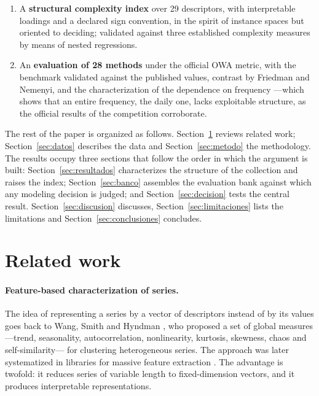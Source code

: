 \begin{enumerate}
      combining becomes a hindrance and the contribution of stratification loses
      significance. The regime is a property of the set of models and is determined
      frequency by frequency, not globally. From this follows an operating rule ---look at
      the quality spread of the pool before deciding--- which this work does not validate
      outside M4 for the regime, although the replication on M3 confirms it on the
      selection side.
\item A \textbf{structural complexity index} over 29 descriptors, with interpretable
      loadings and a declared sign convention, in the spirit of instance spaces
      \cite{kang2017} but oriented to deciding; validated against three established
      complexity measures by means of nested regressions.
\item An \textbf{evaluation of 28 methods} under the official OWA metric, with the
      benchmark validated against the published values, contrast by Friedman and Nemenyi,
      and the characterization of the dependence on frequency ---which shows that an
      entire frequency, the daily one, lacks exploitable structure, as the official
      results of the competition corroborate.
\end{enumerate}

The rest of the paper is organized as follows. Section~\ref{sec:trabajo} reviews related
work; Section~\ref{sec:datos} describes the data and Section~\ref{sec:metodo} the
methodology. The results occupy three sections that follow the order in which the argument
is built: Section~\ref{sec:resultados} characterizes the structure of the collection and
raises the index; Section~\ref{sec:banco} assembles the evaluation bank against which any
modeling decision is judged; and Section~\ref{sec:decision} tests the central result.
Section~\ref{sec:discusion} discusses, Section~\ref{sec:limitaciones} lists the
limitations and Section~\ref{sec:conclusiones} concludes.


\section{Related work}\label{sec:trabajo}

\paragraph{Feature-based characterization of series.} The idea of representing a series by
a vector of descriptors instead of by its values goes back to Wang, Smith and Hyndman
\cite{wang2006}, who proposed a set of global measures ---trend, seasonality,
autocorrelation, nonlinearity, kurtosis, skewness, chaos and self-similarity--- for
clustering heterogeneous series. The approach was later systematized in libraries for
massive feature extraction \cite{fulcher2017}. The advantage is twofold: it reduces series
of variable length to fixed-dimension vectors, and it produces interpretable
representations.

